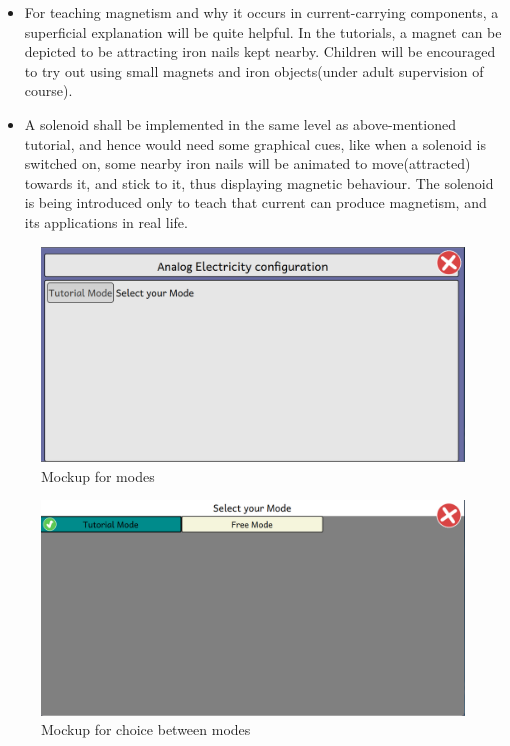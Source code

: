 \documentclass[preprint,12pt]{elsarticle}
\begin{document}
\begin{itemize}
\begin{itemize}
\begin{itemize}
					\item {For teaching magnetism and why it occurs in current-carrying components, a superficial explanation will be quite helpful. In the tutorials, a magnet can be depicted to be attracting iron nails kept nearby. Children will be encouraged to try out using small magnets and iron objects(under adult supervision of course).}
					
					\item {A solenoid shall be implemented in the same level as above-mentioned tutorial, and hence would need some graphical cues, like when a solenoid is switched on, some nearby iron nails will be animated to move(attracted) towards it, and stick to it, thus displaying magnetic behaviour. The solenoid is being introduced only to teach that current can produce magnetism, and its applications in real life.}					
					
					\end{itemize}
			\end{itemize}
			
			\begin{figure}[H]
			\centering\includegraphics[width=0.9\linewidth]{./images/gsoc2}
			\caption{Mockup for modes}
			\end{figure}
			
			\begin{figure}[H]
			\centering\includegraphics[width=0.9\linewidth]{./images/gsoc3}
			\caption{Mockup for choice between modes}
			\end{figure}
			

\end{itemize}
\end{document}
